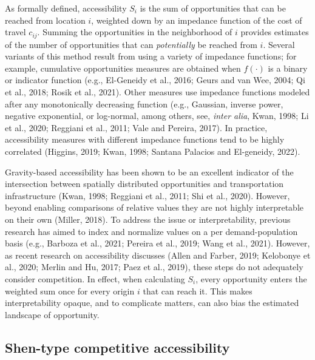 \documentclass[]{elsarticle} %
\begin{document}
As formally defined, accessibility \(S_i\) is the sum of opportunities
that can be reached from location \(i\), weighted down by an impedance
function of the cost of travel \(c_{ij}\). Summing the opportunities in
the neighborhood of \(i\) provides estimates of the number of
opportunities that can \emph{potentially} be reached from \(i\). Several
variants of this method result from using a variety of impedance
functions; for example, cumulative opportunities measures are obtained
when \(f(\cdot)\) is a binary or indicator function (e.g., El-Geneidy et
al., 2016; Geurs and van Wee, 2004; Qi et al., 2018; Rosik et al.,
2021). Other measures use impedance functions modeled after any
monotonically decreasing function (e.g., Gaussian, inverse power,
negative exponential, or log-normal, among others, see, \emph{inter
alia}, Kwan, 1998; Li et al., 2020; Reggiani et al., 2011; Vale and
Pereira, 2017). In practice, accessibility measures with different
impedance functions tend to be highly correlated (Higgins, 2019; Kwan,
1998; Santana Palacios and El-geneidy, 2022).

Gravity-based accessibility has been shown to be an excellent indicator
of the intersection between spatially distributed opportunities and
transportation infrastructure (Kwan, 1998; Reggiani et al., 2011; Shi et
al., 2020). However, beyond enabling comparisons of relative values they
are not highly interpretable on their own (Miller, 2018). To address the
issue or interpretability, previous research has aimed to index and
normalize values on a per demand-population basis (e.g., Barboza et al.,
2021; Pereira et al., 2019; Wang et al., 2021). However, as recent
research on accessibility discusses (Allen and Farber, 2019; Kelobonye
et al., 2020; Merlin and Hu, 2017; Paez et al., 2019), these steps do
not adequately consider competition. In effect, when calculating
\(S_i\), every opportunity enters the weighted sum once for every origin
\(i\) that can reach it. This makes interpretability opaque, and to
complicate matters, can also bias the estimated landscape of
opportunity.

\hypertarget{shen-type-competitive-accessibility}{%
\subsection{Shen-type competitive
accessibility}\label{shen-type-competitive-accessibility}}
\end{document}

